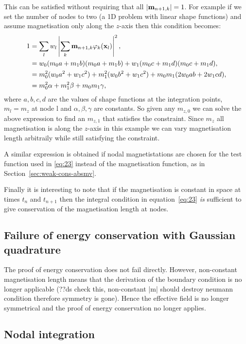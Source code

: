 This can be satisfied without requiring that all $\left|{\mathbf{m}_{n+1, k}} \right| = 1$.
For example if we set the number of nodes to two (a 1D problem with linear shape functions) and assume magnetisation only along the $z$-axis then this condition becomes:
\begin{equation}
  \begin{aligned}
    1 &= \sum_l w_l \left|{\sum_k \mathbf{m}_{n+1, k} \varphi_k(\mathbf{x}_l)} \right|^2, \\
    &= w_0 (m_0 a + m_1 b)(m_0 a + m_1 b) + w_1 (m_0 c + m_1 d)(m_0 c + m_1 d), \\
    &= m_0^2 (w_0 a^2 + w_1 c^2) + m_1^2 (w_0 b^2 + w_1 c^2) + m_0 m_1 (2w_0ab + 2w_1cd), \\
    &= m_0^2 \alpha + m_1^2 \beta + m_0 m_1 \gamma, \\
  \end{aligned}
\end{equation}
where $a,b,c,d$ are the values of shape functions at the integration points, $m_l = m_{z}$ at node l and $\alpha, \beta, \gamma$ are constants.
So given any $m_{z,0}$ we can solve the above expression to find an $m_{z,1}$ that satisfies the constraint.
Since $m_z$ all magnetisation is along the $z$-axis in this example we can vary magnetisation length arbitraily while still satisfying the constraint.

A similar expression is obtained if nodal magnetistations are chosen for the test function used in \eqref{eq:23} instead of the magnetisation function, as in Section~\ref{sec:weak-cons-absmv}.

Finally it is interesting to note that if the magnetisation is constant in space at times $t_n$ and $t_{n+1}$ then the integral condition in equation~\ref{eq:23} \emph{is} sufficient to give conservation of the magnetisation length at nodes.


\subsection{Failure of energy conservation with Gaussian quadrature}

The proof of energy conservation does not fail directly.
However, non-constant magnetisation length means that the derivation of the boundary condition is no longer applicable (??ds check this, non-constant |m| should destroy neumann condition therefore symmetry is gone).
Hence the effective field is no longer symmetrical and the proof of energy conservation no longer applies.

\subsection{Nodal integration}

